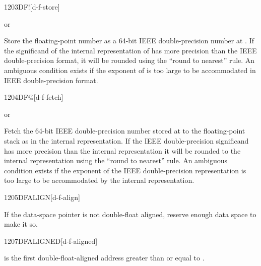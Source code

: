 \begin{worddef}{1203}{DF!}[d-f-store]
\item {}  or

	Store the floating-point number  as a 64-bit IEEE
	double-precision number at . If the significand
	of the internal representation of  has more precision than
	the IEEE double-precision format, it will be rounded using the
	``round to nearest'' rule. An ambiguous condition exists if the
	exponent of  is too large to be accommodated in IEEE
	double-precision format.

\end{worddef}


\begin{worddef}{1204}{DF@}[d-f-fetch]
\item {}  or

	Fetch the 64-bit IEEE double-precision number stored at
	 to the floating-point stack as  in the
	internal representation. If the IEEE double-precision
	significand has more precision than the internal representation
	it will be rounded to the internal representation using the
	``round to nearest'' rule. An ambiguous condition exists if the
	exponent of the IEEE double-precision representation is too
	large to be accommodated by the internal representation.

\end{worddef}


\begin{worddef}{1205}{DFALIGN}[d-f-align]
\item \stack{}{}

	If the data-space pointer is not double-float aligned, reserve
	enough data space to make it so.

\end{worddef}

\enlargethispage{4ex}
\begin{worddef}{1207}{DFALIGNED}[d-f-aligned]
\item {}

	 is the first double-float-aligned address greater
	than or equal to .

\end{worddef}


